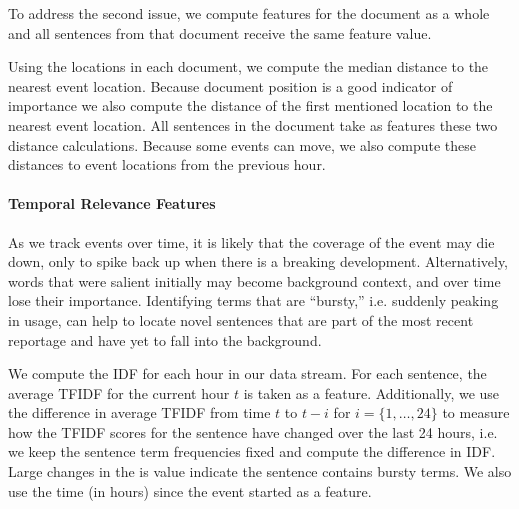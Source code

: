 To address the second issue, 
we compute features for the document as a whole and all
sentences from that document receive the same feature value.

Using the locations in each document, we compute the median distance to the 
nearest event location. Because document position is a good indicator 
of importance we also compute the distance of the first mentioned
location to the nearest event location. All sentences in the document take
as features these two distance calculations.
Because some events can move, we also
compute these distances to event locations from the previous hour.



\paragraph{Temporal Relevance Features}
As we track events over time, it is likely that the coverage of the event 
may die down, only to spike back up when there is a breaking development.
Alternatively, words that were salient initially may become background context,
and over time lose their importance.
Identifying terms that are ``bursty,'' i.e. suddenly peaking in usage,
can help to locate novel sentences that are part of the most recent reportage
and have yet to fall into the background.

We compute the IDF for each hour in our data stream. 
For each sentence, the average TFIDF for the current hour $t$ is taken as a 
feature. Additionally, we use the difference in average TFIDF from time $t$
to $t-i$ for $i = \{1, \ldots, 24\}$ to measure how the TFIDF scores for the 
sentence have changed over the last 24 hours, i.e. we keep the sentence
term frequencies fixed and compute the difference in IDF. Large changes
in the is value indicate the sentence contains bursty terms.
We also use the time (in hours) since the event started as a feature.

